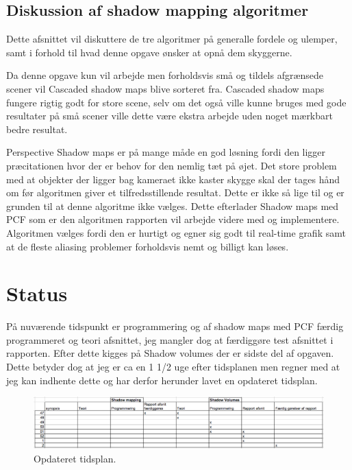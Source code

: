 \documentclass[11pt,a4paper]{article}
\begin{document}
\subsection{Diskussion af shadow mapping algoritmer}

Dette afsnittet vil diskuttere de tre algoritmer på generalle fordele og ulemper,  samt i forhold til hvad denne opgave ønsker at opnå dem skyggerne.

Da denne opgave kun vil arbejde men forholdsvis små og tildels afgrænsede scener vil Cascaded shadow maps blive sorteret fra. Cascaded shadow maps fungere rigtig godt for store scene, selv om det også ville kunne bruges med gode resultater på små scener ville dette være ekstra arbejde uden noget mærkbart bedre resultat. 

Perspective Shadow maps er på mange måde en god løsning fordi den ligger præcitationen hvor der er behov for den nemlig tæt på øjet. Det store problem med at objekter der ligger bag kameraet ikke kaster skygge skal der tages hånd om før algoritmen giver et tilfredsstillende resultat. Dette er ikke så lige til og er grunden til at denne algoritme ikke vælges. Dette efterlader Shadow maps med PCF som er den algoritmen rapporten vil arbejde videre med og implementere. Algoritmen vælges fordi den er hurtigt og egner sig godt til real-time grafik samt at de fleste aliasing problemer forholdsvis nemt og billigt kan løses.




\section{Status}

På nuværende tidspunkt er programmering og af shadow maps med PCF færdig programmeret og teori afsnittet, jeg mangler dog at færdiggøre test afsnittet i rapporten. Efter dette kigges på Shadow volumes der er sidste del af opgaven. Dette betyder dog at jeg er ca en 1 1/2 uge efter tidsplanen men regner med at jeg kan indhente dette og har derfor herunder lavet en opdateret tidsplan.
 
\begin{figure}[ht!]
\centering
\includegraphics[width=140mm]{img/TIDSPLAN.PNG}
\caption{Opdateret tidsplan.}
\label{shadowmapdesc}
\end{figure}
\end{document}
